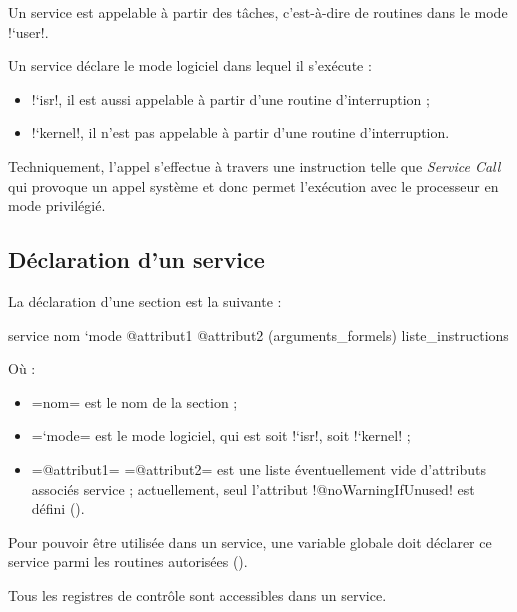 Un service est appelable à partir des tâches, c'est-à-dire de routines dans le mode \plm!`user!.

Un service déclare le mode logiciel dans lequel il s'exécute :
\begin{itemize}
  \item \plm!`isr!, il est aussi appelable à partir d'une routine d'interruption  ;
  \item \plm!`kernel!, il n'est pas appelable à partir d'une routine d'interruption.
\end{itemize}


Techniquement, l'appel s'effectue à travers une instruction telle que \emph{Service Call} qui provoque un appel système et donc permet l'exécution avec le processeur en mode privilégié.



\subsection{Déclaration d'un service}


La déclaration d'une section est la suivante :
\begin{PLM}
service nom `mode @attribut1 @attribut2 (arguments_formels) {
  liste_instructions
}
\end{PLM}
Où :
\begin{itemize}
  \item \plm=nom= est le nom de la section ;
  \item \plm=`mode= est le mode logiciel, qui est soit \plm!`isr!, soit \plm!`kernel! ;
  \item \plm=@attribut1= \plm=@attribut2= est une liste éventuellement vide d'attributs associés service ; actuellement, seul l'attribut \plm!@noWarningIfUnused! est défini ().
\end{itemize}




Pour pouvoir être utilisée dans un service, une variable globale doit déclarer ce service parmi les routines autorisées ().




Tous les registres de contrôle sont accessibles dans un service.








